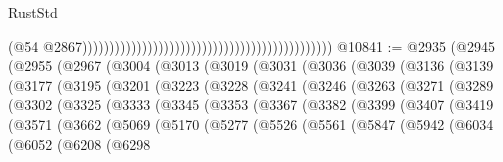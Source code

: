 \begin{lexlean}{RustStd}
\begin{coremodule}
{{{{{{{{{{{{{{{{{{{                                                                                              (@54
                                                                                                @2867))))))))))))))))))))))))))))))))))))))))))))))
@10841 := @2935
    (@2945
      (@2955
        (@2967
          (@3004
            (@3013
              (@3019
                (@3031
                  (@3036
                    (@3039
                      (@3136
                        (@3139
                          (@3177
                            (@3195
                              (@3201
                                (@3223
                                  (@3228
                                    (@3241
                                      (@3246
                                        (@3263
                                          (@3271
                                            (@3289
                                              (@3302
                                                (@3325
                                                  (@3333
                                                    (@3345
                                                      (@3353
                                                        (@3367
                                                          (@3382
                                                            (@3399
                                                              (@3407
                                                                (@3419
                                                                  (@3571
                                                                    (@3662
                                                                      (@5069
                                                                        (@5170
                                                                          (@5277
                                                                            (@5526
                                                                              (@5561
                                                                                (@5847
                                                                                  (@5942
                                                                                    (@6034
                                                                                      (@6052
                                                                                        (@6208
                                                                                          (@6298
}}}}}}}}}}}}}}}}}}}
\end{coremodule}
\end{lexlean}
